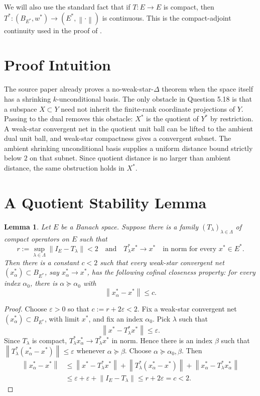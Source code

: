 \documentclass[11pt]{article}
\newtheorem{lemma}{Lemma}
\newcommand{\eps}{\varepsilon}
\newcommand{\norm}[1]{\left\lVert #1 \right\rVert}
\newcommand{\ball}{B}
\newcommand{\id}{I}
\begin{document}
We will also use the standard fact that if \(T:E\to E\) is compact, then
\(T^*:(\ball_{E^*},w^*)\to(E^*,\norm{\cdot})\) is continuous.  This is the
compact-adjoint continuity used in the proof of \cite[Theorem 5.12]{AALMPPV2023}.

\section*{Proof Intuition}

The source paper already proves a no-weak-star-\(\Delta\) theorem when the
space itself has a shrinking \(k\)-unconditional basis.  The only obstacle in
Question 5.18 is that a subspace \(X\subset Y\) need not inherit the finite-rank
coordinate projections of \(Y\).  Passing to the dual removes this obstacle:
\(X^*\) is the quotient of \(Y^*\) by restriction.  A weak-star convergent net
in the quotient unit ball can be lifted to the ambient dual unit ball, and
weak-star compactness gives a convergent subnet.  The ambient shrinking
unconditional basis supplies a uniform distance bound strictly below \(2\) on
that subnet.  Since quotient distance is no larger than ambient distance, the
same obstruction holds in \(X^*\).

\section*{A Quotient Stability Lemma}

\begin{lemma}\label{lem:ambient-bound}
Let \(E\) be a Banach space.  Suppose there is a family
\((T_\lambda)_{\lambda\in\Lambda}\) of compact operators on \(E\) such that
\[
  r:=\sup_{\lambda\in\Lambda}\norm{\id_E-T_\lambda}<2
  \quad\text{and}\quad
  T_\lambda^*x^*\to x^*
  \quad\text{in norm for every }x^*\in E^*.
\]
Then there is a constant \(c<2\) such that every weak-star convergent net
\((x_\alpha^*)\subset \ball_{E^*}\), say \(x_\alpha^*\to x^*\), has the
following cofinal closeness property: for every index \(\alpha_0\), there is
\(\alpha\succeq\alpha_0\) with
\[
  \norm{x_\alpha^*-x^*}\le c .
\]
\end{lemma}

\begin{proof}
Choose \(\eps>0\) so that \(c:=r+2\eps<2\).  Fix a weak-star convergent net
\((x_\alpha^*)\subset \ball_{E^*}\), with limit \(x^*\), and fix an index
\(\alpha_0\).  Pick \(\lambda\) such that
\[
  \norm{x^*-T_\lambda^*x^*}\le \eps.
\]
Since \(T_\lambda\) is compact, \(T_\lambda^*x_\alpha^*\to T_\lambda^*x^*\)
in norm.  Hence there is an index \(\beta\) such that
\(\norm{T_\lambda^*(x_\alpha^*-x^*)}\le\eps\) whenever
\(\alpha\succeq\beta\).  Choose \(\alpha\succeq\alpha_0,\beta\).  Then
\[
\begin{aligned}
\norm{x_\alpha^*-x^*}
&\le
\norm{x^*-T_\lambda^*x^*}
+\norm{T_\lambda^*(x_\alpha^*-x^*)}
+\norm{x_\alpha^*-T_\lambda^*x_\alpha^*}  \\
&\le \eps+\eps+\norm{\id_E-T_\lambda}
\le r+2\eps
=c<2 .
\end{aligned}
\]
\end{proof}
\end{document}
